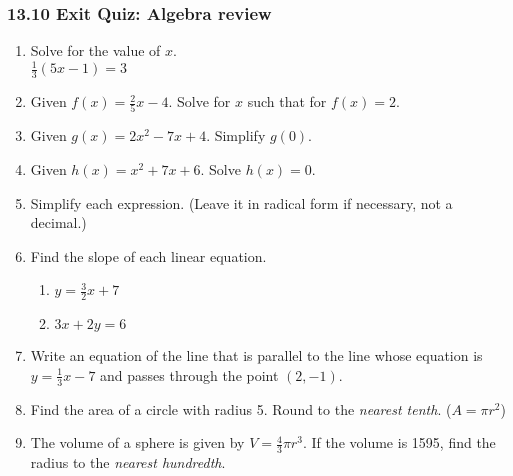 \documentclass[12pt, twoside]{article}
\begin{document}
\subsubsection*{13.10 Exit Quiz: Algebra review}
 \begin{enumerate}


  \item   Solve for the value of $x$.\\[0.5cm]
  $\frac{1}{3}(5x-1)=3$ \vspace{4cm}

  \item Given $f(x)=\frac{2}{5} x-4$. Solve for $x$ such that for $f(x)=2$. \vspace{5cm}
  \item Given $g(x)=2x^2-7x+4$. Simplify $g(0)$. \vspace{4cm}
  \item Given $h(x)=x^2+7x+6$. Solve $h(x)=0$. \vspace{5cm}

\newpage
  \item Simplify each expression. (Leave it in radical form if necessary, not a decimal.)
    \begin{enumerate}
    \end{enumerate} \vspace{2cm}

  \item Find the slope of each linear equation.
    \begin{enumerate}
      \item $y=\frac{3}{2}x+7$
      \vspace{2cm}
      \item $3x+2y=6$
      \vspace{3.5cm}
    \end{enumerate}

  \item Write an equation of the line that is parallel to the line whose equation is $y=\frac{1}{3}x-7$ and passes through the point $(2,-1)$. \vspace{2cm}

  \item Find the area of a circle with radius 5. Round to the \emph{nearest tenth}.  ($A=\pi r^2$) \vspace{2cm}

  \item The volume of a sphere is given by $V=\frac{4}{3} \pi r^3$. If the volume is 1595, find the radius to the \emph{nearest hundredth}.

\end{enumerate}
\end{document}
